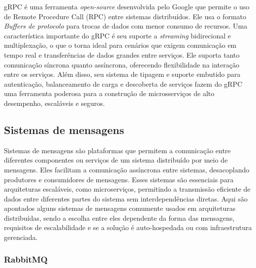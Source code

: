 gRPC é uma ferramenta \emph{open-source} desenvolvida pelo Google que permite o uso de Remote Procedure Call (RPC) entre sistemas distribuídos. Ele usa o formato \emph{Buffers de protocolo} para trocas de dados com menor consumo de recursos. Uma característica importante do gRPC é seu suporte a \emph{streaming} bidirecional e multiplexação, o que o torna ideal para cenários que exigem comunicação em tempo real e transferências de dados grandes entre serviços. Ele suporta tanto comunicação síncrona quanto assíncrona, oferecendo flexibilidade na interação entre os serviços. 
Além disso, seu sistema de tipagem e suporte embutido para autenticação, balanceamento de carga e descoberta de serviços fazem do gRPC uma ferramenta poderosa para a construção de microsserviços de alto desempenho, escaláveis e seguros. \cite{grpc}

\subsection{Sistemas de mensagens}
Sistemas de mensagens são plataformas que permitem a comunicação entre diferentes componentes ou serviços de um sistema distribuído por meio de mensagens. Eles facilitam a comunicação assíncrona entre sistemas, desacoplando produtores e consumidores de mensagens. Esses sistemas são essenciais para arquiteturas escaláveis, como microserviços, permitindo a transmissão eficiente de dados entre diferentes partes do sistema sem interdependências diretas. Aqui são apontados alguns sistemas de mensagens comumente usados em arquiteturas distribuídas, sendo a escolha entre eles dependente da forma das mensagens, requisitos de escalabilidade e se a solução é auto-hospedada ou com infraestrutura gerenciada.

\subsubsection*{RabbitMQ}

